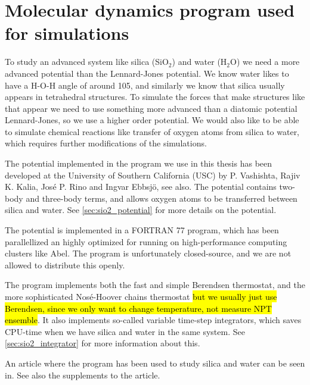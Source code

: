 \chapter{Molecular dynamics program used for simulations}
To study an advanced system like silica (SiO$_2$) and water (H$_2$O) we need a more advanced potential than the Lennard-Jones potential. We know water likes to have a H-O-H angle of around 105, and similarly we know that silica usually appears in tetrahedral structures. To simulate the forces that make structures like that appear we need to use something more advanced than a diatomic potential Lennard-Jones, so we use a higher order potential. We would also like to be able to simulate chemical reactions like transfer of oxygen atoms from silica to water, which requires further modifications of the simulations.

The potential implemented in the program we use in this thesis has been developed at the University of Southern California (USC) by P. Vashishta, Rajiv K. Kalia, José P. Rino and Ingvar Ebbsj\"o\cite{vashishta1990interaction}, see also\cite{shekhar2013nanobubble,shekhar2013nanobubble_supplements}. The potential contains two-body and three-body terms, and allows oxygen atoms to be transferred between silica and water. See \cref{sec:sio2_potential} for more details on the potential.

The potential is implemented in a FORTRAN 77 program, which has been parallellized an highly optimized for running on high-performance computing clusters like Abel. The program is unfortunately closed-source, and we are not allowed to distribute this openly.

The program implements both the fast and simple Berendsen thermostat, and the more sophisticated Nos\'e-Hoover chains thermostat \hl{but we usually just use Berendsen, since we only want to change temperature, not measure NPT ensemble}. It also implements so-called variable time-step integrators, which saves CPU-time when we have silica and water in the same system. See \cref{sec:sio2_integrator} for more information about this.

An article where the program has been used to study silica and water can be seen in\cite{shekhar2013nanobubble}. See also the supplements to the article\cite{shekhar2013nanobubble_supplements}.




